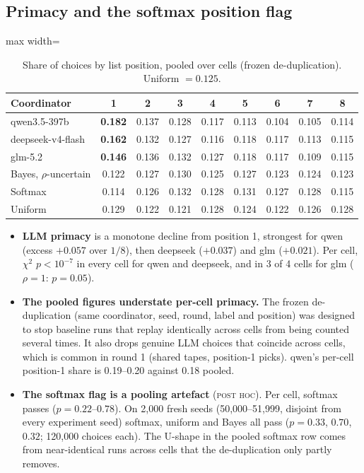 \documentclass[11pt,letterpaper]{article}
\newcommand{\posthoc}{\textsc{post hoc}}
\numberwithin{equation}{section}
\numberwithin{table}{section}
\numberwithin{figure}{section}
\numberwithin{algorithm}{section}
\begin{document}
\subsection{Primacy and the softmax position flag}\label{app:primacy}

\begin{table}[h]
\centering\small
\caption{Share of choices by list position, pooled over cells (frozen de-duplication). Uniform $=0.125$.}
\label{tab:positions}
\begin{adjustbox}{max width=\linewidth}
\begin{tabular}{lcccccccc}
\toprule
Coordinator & 1 & 2 & 3 & 4 & 5 & 6 & 7 & 8 \\
\midrule
qwen3.5-397b & \textbf{0.182} & 0.137 & 0.128 & 0.117 & 0.113 & 0.104 & 0.105 & 0.114 \\
deepseek-v4-flash & \textbf{0.162} & 0.132 & 0.127 & 0.116 & 0.118 & 0.117 & 0.113 & 0.115 \\
glm-5.2 & \textbf{0.146} & 0.136 & 0.132 & 0.127 & 0.118 & 0.117 & 0.109 & 0.115 \\
Bayes, $\rho$-uncertain & 0.122 & 0.127 & 0.130 & 0.125 & 0.127 & 0.123 & 0.124 & 0.123 \\
Softmax & 0.114 & 0.126 & 0.132 & 0.128 & 0.131 & 0.127 & 0.128 & 0.115 \\
Uniform & 0.129 & 0.122 & 0.121 & 0.128 & 0.124 & 0.122 & 0.126 & 0.128 \\
\bottomrule
\end{tabular}
\end{adjustbox}
\end{table}

\begin{itemize}
  \item \textbf{LLM primacy} is a monotone decline from position 1, strongest for qwen (excess $+0.057$ over $1/8$), then deepseek ($+0.037$) and glm ($+0.021$). Per cell, $\chi^2$ $p<10^{-7}$ in every cell for qwen and deepseek, and in 3 of 4 cells for glm ($\rho=1$: $p=0.05$).
  \item \textbf{The pooled figures understate per-cell primacy.} The frozen de-duplication (same coordinator, seed, round, label and position) was designed to stop baseline runs that replay identically across cells from being counted several times. It also drops genuine LLM choices that coincide across cells, which is common in round 1 (shared tapes, position-1 picks). qwen's per-cell position-1 share is 0.19--0.20 against 0.18 pooled.
  \item \textbf{The softmax flag is a pooling artefact} (\posthoc). Per cell, softmax passes ($p=0.22$--$0.78$). On 2{,}000 fresh seeds (50{,}000--51{,}999, disjoint from every experiment seed) softmax, uniform and Bayes all pass ($p=0.33$, $0.70$, $0.32$; 120{,}000 choices each). The U-shape in the pooled softmax row comes from near-identical runs across cells that the de-duplication only partly removes.
\end{itemize}
\end{document}
